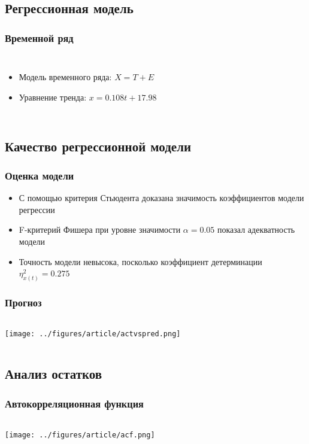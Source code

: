\documentclass[10pt,pdf,aspectratio=169]{beamer}
\begin{document}
\subsection{Регрессионная модель}
\begin{frame}
  \frametitle{Временной ряд}   %
  \begin{columns}[c]
  \column{2in}  %
  \begin{itemize}
  \item<1-> Модель временного ряда: $X = T + E$
  \item<2-> Уравнение тренда: $x = 0.108t + 17.98$
  \end{itemize}
  \column{3in}
  \end{columns}
\end{frame}

\subsection{Качество регрессионной модели}
\begin{frame}
  \frametitle{Оценка модели}   %
  \begin{itemize}
    \item<1-> С помощью критерия Стьюдента доказана значимость коэффициентов модели регрессии
    \item<2-> F-критерий Фишера при уровне значимости $\alpha = 0.05$ показал адекватность модели
    \item<3-> Точность модели невысока, посколько коэффициент детерминации $\eta^2_{x(t)} = 0.275$
  \end{itemize}
\end{frame}

\begin{frame}
  \frametitle{Прогноз}   %
   \begin{columns}[c]
   \column{4.5in}
  \texttt{[image: ../figures/article/actvspred.png]}
  \end{columns}
\end{frame}


\subsection{Анализ остатков}

\begin{frame}
  \frametitle{Автокорреляционная функция}   %
   \begin{columns}[c]
   \column{4.5in}
  \texttt{[image: ../figures/article/acf.png]}
  \end{columns}
\end{frame}
\end{document}
